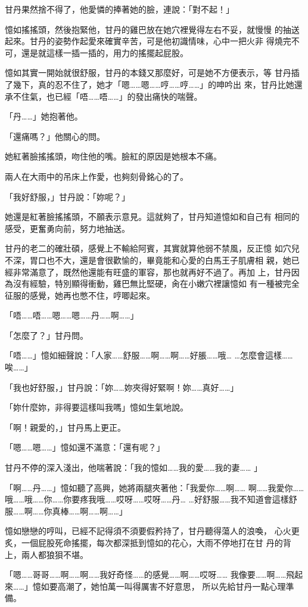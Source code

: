 甘丹果然捨不得了，他愛憐的捧著她的臉，連說：「對不起！」

憶如搖搖頭，然後抱緊他，甘丹的雞巴放在她穴裡覺得左右不妥，就慢慢
的抽送起來。甘丹的姿勢作起愛來確實辛苦，可是他初識情味，心中一把火非
得燒完不可，還是就這樣一插一插的，用力的搖擺起屁股。

憶如其實一開始就很舒服，甘丹的本錢又那麼好，可是她不方便表示，等
甘丹插了幾下，真的忍不住了，她才「嗯……嗯……哼……哼……」的呻吟出
來，甘丹比她還承不住氣，也已經「唔……唔……」的發出痛快的喘聲。

「丹……」她抱著他。

「還痛嗎？」他關心的問。

她紅著臉搖搖頭，吻住他的嘴。臉紅的原因是她根本不痛。

兩人在大雨中的吊床上作愛，也夠刻骨銘心的了。

「我好舒服，」甘丹說：「妳呢？」

她還是紅著臉搖搖頭，不願表示意見。這就夠了，甘丹知道憶如和自己有
相同的感受，更奮勇向前，努力地抽送。

甘丹的老二的確壯碩，感覺上不輸給阿賓，其實就算他弱不禁風，反正憶
如穴兒不深，胃口也不大，還是會很歡愉的，畢竟能和心愛的白馬王子肌膚相
親，她已經非常滿意了，既然他還能有旺盛的軍容，那也就再好不過了。再加
上，甘丹因為沒有經驗，特別顯得衝動，雞巴無比堅硬，肏在小嫩穴裡讓憶如
有一種被完全征服的感覺，她再也憋不住，哼唧起來。

「唔……唔……嗯……嗯……丹……啊……」

「怎麼了？」甘丹問。

「唔……」憶如細聲說：「人家……舒服……啊……啊……好脹……哦…
…怎麼會這樣……唉……」

「我也好舒服，」甘丹說：「妳……妳夾得好緊啊！妳……真好……」

「妳什麼妳，非得要這樣叫我嗎」憶如生氣地說。

「啊！親愛的，」甘丹馬上更正。

「嗯……嗯……」憶如還不滿意：「還有呢？」

甘丹不停的深入淺出，他喘著說：「我的憶如……我的愛……我的妻……
」

「啊……丹……」憶如聽了高興，她將兩腿夾著他：「我愛你……啊……
啊……我愛你……哦……哦……你……你要疼我哦……哎呀……哎呀……丹…
…好舒服……我不知道會這樣舒服……啊……你真棒……啊……啊……」

憶如戀戀的哼叫，已經不記得須不須要假矜持了，甘丹聽得蕩人的浪喚，
心火更炙，一個屁股死命搖擺，每次都深抵到憶如的花心，大雨不停地打在甘
丹的背上，兩人都狼狽不堪。

「嗯……哥哥……啊……啊……我好奇怪……的感覺……啊……哎呀……
我像要……啊……飛起來……」憶如要高潮了，她怕萬一叫得厲害不好意思，
所以先給甘丹一點心理準備。

